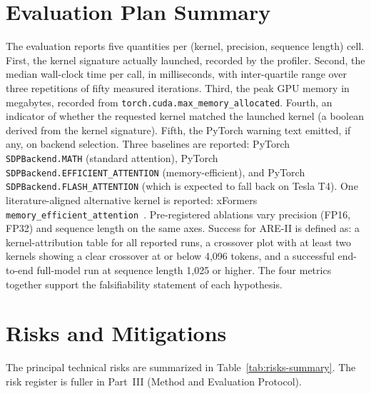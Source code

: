 \documentclass[11pt]{article}
\begin{document}
\section{Evaluation Plan Summary}

The evaluation reports five quantities per (kernel, precision, sequence length) cell. First, the kernel signature actually launched, recorded by the profiler. Second, the median wall-clock time per call, in milliseconds, with inter-quartile range over three repetitions of fifty measured iterations. Third, the peak GPU memory in megabytes, recorded from \texttt{torch.cuda.max\_memory\_allocated}. Fourth, an indicator of whether the requested kernel matched the launched kernel (a boolean derived from the kernel signature). Fifth, the PyTorch warning text emitted, if any, on backend selection. Three baselines are reported: PyTorch \texttt{SDPBackend.MATH} (standard attention), PyTorch \texttt{SDPBackend.EFFICIENT\_ATTENTION} (memory-efficient), and PyTorch \texttt{SDPBackend.FLASH\_ATTENTION} (which is expected to fall back on Tesla T4). One literature-aligned alternative kernel is reported: xFormers \texttt{memory\_efficient\_attention}~\parencite{xformers2022}. Pre-registered ablations vary precision (FP16, FP32) and sequence length on the same axes. Success for ARE-II is defined as: a kernel-attribution table for all reported runs, a crossover plot with at least two kernels showing a clear crossover at or below 4{,}096 tokens, and a successful end-to-end full-model run at sequence length 1{,}025 or higher. The four metrics together support the falsifiability statement of each hypothesis.

\section{Risks and Mitigations}

The principal technical risks are summarized in Table~\ref{tab:risks-summary}. The risk register is fuller in Part~III (Method and Evaluation Protocol).
\end{document}
